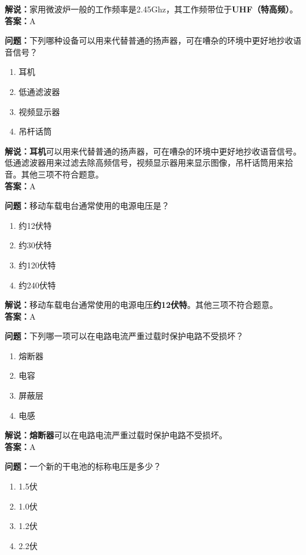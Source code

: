 \textbf{解说：}家用微波炉一般的工作频率是2.45Ghz，其工作频带位于\textbf{UHF（特高频）}。\\\textbf{答案：}A


\textbf{问题：}下列哪种设备可以用来代替普通的扬声器，可在嘈杂的环境中更好地抄收语音信号？

\begin{enumerate}[label=\Alph*), leftmargin=1.5cm]
	\item 耳机
	\item 低通滤波器
	\item 视频显示器
	\item 吊杆话筒
\end{enumerate}

\textbf{解说：耳机}可以用来代替普通的扬声器，可在嘈杂的环境中更好地抄收语音信号。低通滤波器用来过滤去除高频信号，视频显示器用来显示图像，吊杆话筒用来拾音。其他三项不符合题意。\\\textbf{答案：}A%


\textbf{问题：}移动车载电台通常使用的电源电压是？

\begin{enumerate}[label=\Alph*), leftmargin=1.5cm]
	\item 约12伏特
	\item 约30伏特
	\item 约120伏特
	\item 约240伏特
\end{enumerate}

\textbf{解说：}移动车载电台通常使用的电源电压\textbf{约12伏特}。其他三项不符合题意。\\\textbf{答案：}A


\textbf{问题：}下列哪一项可以在电路电流严重过载时保护电路不受损坏？

\begin{enumerate}[label=\Alph*), leftmargin=1.5cm]
	\item 熔断器
	\item 电容
	\item 屏蔽层
	\item 电感
\end{enumerate}

\textbf{解说：熔断器}可以在电路电流严重过载时保护电路不受损坏。\\\textbf{答案：}A%

\textbf{问题：}一个新的干电池的标称电压是多少？

\begin{enumerate}[label=\Alph*), leftmargin=1.5cm]
	\item 1.5伏
	\item 1.0伏
	\item 1.2伏
	\item 2.2伏
\end{enumerate}

